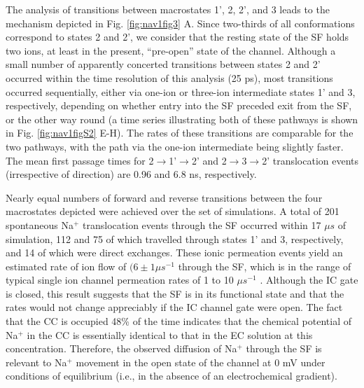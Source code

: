 \begin{refsection}
The analysis of transitions between macrostates 1', 2, 2', and 3 leads to the mechanism depicted in Fig. \ref{fig:nav1fig3} A.  Since two-thirds of all conformations correspond to states 2 and 2', we consider that the resting state of the SF holds two ions, at least in the present, ``pre-open'' state of the channel.  Although a small number of apparently concerted transitions between states 2 and 2' occurred within the time resolution of this analysis (25 ps), most transitions occurred sequentially, either via one-ion or three-ion intermediate states 1' and 3, respectively, depending on whether entry into the SF preceded exit from the SF, or the other way round (a time series illustrating both of these pathways is shown in Fig. \ref{fig:nav1figS2} E-H).  The rates of these transitions are comparable for the two pathways, with the path via the one-ion intermediate being slightly faster.  The mean first passage times for 2$\rightarrow$1'$\rightarrow$2' and 2$\rightarrow$3$\rightarrow$2' translocation events (irrespective of direction) are 0.96 and 6.8 ns, respectively.   

Nearly equal numbers of forward and reverse transitions between the four macrostates depicted were achieved over the set of simulations.  A total of 201 spontaneous Na$^+$ translocation events through the SF occurred within 17 $\mu s$ of simulation, 112 and 75 of which travelled through states 1' and 3, respectively, and 14 of which were direct exchanges.  These ionic permeation events yield an estimated rate of ion flow of $(6 \pm 1 \mu s^{-1}$ through the SF, which is in the range of typical single ion channel permeation rates of 1 to 10 $\mu s^{-1}$ \cite{Hille:2001tw}.  Although the IC gate is closed, this result suggests that the SF is in its functional state and that the rates would not change appreciably if the IC channel gate were open.  The fact that the CC is occupied 48\% of the time indicates that the chemical potential of Na$^+$ in the CC is essentially identical to that in the EC solution at this concentration.  Therefore, the observed diffusion of Na$^+$ through the SF is relevant to Na$^+$ movement in the open state of the channel at 0 mV under conditions of equilibrium (i.e., in the absence of an electrochemical gradient).  


\end{refsection}
